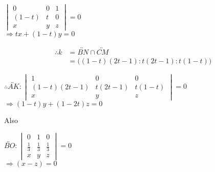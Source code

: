\documentclass[a4paper,10pt]{article}
\begin{document}
\begin{center}
\begin{math}
 \begin{vmatrix}
  0 & 0 & 1\\
  (1-t) & t & 0 \\
 x & y & z
\end{vmatrix}=0 
\end{math}
\vspace{5pt} \\
\begin{math}
\Rightarrow tx+(1-t)y=0
\end{math}
\end{center}


\begin{equation}
\begin{split}
  \therefore k &=\overleftrightarrow{BN} \cap \overleftrightarrow{CM} \\
               &= \big((1-t)(2t-1):t(2t-1):t(1-t)\big)
\end{split}
\end{equation}


\begin{center}
\begin{math}
 \therefore \overleftrightarrow{AK}:
\begin{vmatrix}
  1 & 0 & 0\\
  (1-t)(2t-1) & t(2t-1) & t(1-t) \\
   x & y & z
\end{vmatrix}=0 
\end{math}
\vspace{5pt} \\
\begin{math}
\Rightarrow (1-t)y+(1-2t)z=0
\end{math}
\end{center}


Also
\begin{center}
\begin{math}
 \overleftrightarrow{BO}:
\begin{vmatrix}
  0 & 1 & 0\\
  \frac{1}{3} & \frac{1}{3} & \frac{1}{3} \\
   x & y & z
\end{vmatrix}=0 
\end{math}
\vspace{5pt} \\
\begin{math}
\Rightarrow (x-z)=0
\end{math}
\end{center}
\end{document}
